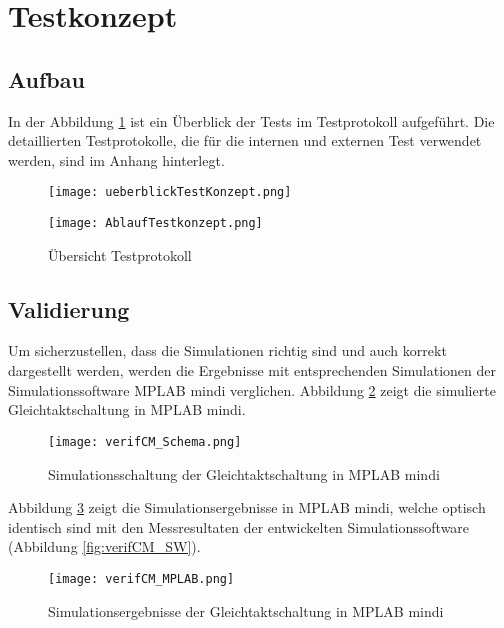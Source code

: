 \section{Testkonzept}\label{sec:testkonzept}

\subsection{Aufbau} \label{subsec:prinzip}

In der Abbildung \ref{fig:Testprotokoll} ist ein Überblick der Tests im Testprotokoll aufgeführt. Die detaillierten Testprotokolle, die für die internen und externen Test verwendet werden, sind im Anhang hinterlegt.

\begin{figure}[H]
	\centering
	\texttt{[image: ueberblickTestKonzept.png]}
\end{figure}

\begin{figure}[H]
	\centering
	\texttt{[image: AblaufTestkonzept.png]}
	\caption{Übersicht Testprotokoll}
	\label{fig:Testprotokoll}
\end{figure}

\newpage

\subsection{Validierung} \label{subsec:validierung}

Um sicherzustellen, dass die Simulationen richtig sind und auch korrekt dargestellt werden, werden die Ergebnisse mit entsprechenden Simulationen der Simulationssoftware MPLAB mindi verglichen. Abbildung \ref{fig:verifCM_Schema} zeigt die simulierte Gleichtaktschaltung in MPLAB mindi.

\begin{figure}[H]
	\centering
	\texttt{[image: verifCM\_Schema.png]}
	\caption{Simulationsschaltung der Gleichtaktschaltung in MPLAB mindi}
	\label{fig:verifCM_Schema}
\end{figure}

Abbildung \ref{fig:verifCM_MPLAB} zeigt die Simulationsergebnisse in MPLAB mindi, welche optisch identisch sind mit den Messresultaten der entwickelten Simulationssoftware (Abbildung \ref{fig:verifCM_SW}).
 
 \begin{figure}[H]
	\centering
	\texttt{[image: verifCM\_MPLAB.png]}
	\caption{Simulationsergebnisse der Gleichtaktschaltung in MPLAB mindi}
	\label{fig:verifCM_MPLAB}
\end{figure}

